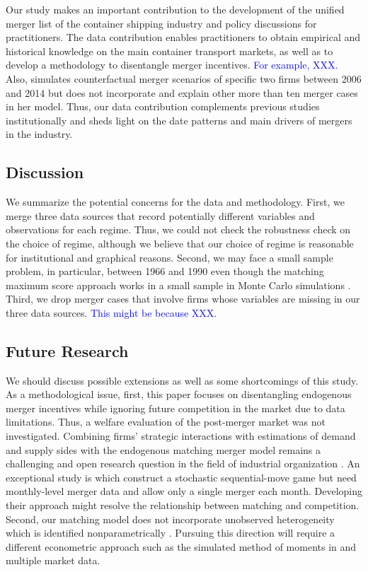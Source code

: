 \documentclass[10pt]{article}
\begin{document}
Our study makes an important contribution to the development of the unified merger list of the container shipping industry and policy discussions for practitioners. 
The data contribution enables practitioners to obtain empirical and historical knowledge on the main container transport markets, as well as to develop a methodology to disentangle merger incentives.
\textcolor{blue}{For example, XXX.} Also, \cite{jeon2022learning} simulates counterfactual merger scenarios of specific two firms between 2006 and 2014 but does not incorporate and explain other more than ten merger cases in her model.
Thus, our data contribution complements previous studies institutionally and sheds light on the date patterns and main drivers of mergers in the industry.


\subsection{Discussion}
We summarize the potential concerns for the data and methodology. 
First, we merge three data sources that record potentially different variables and observations for each regime. 
Thus, we could not check the robustness check on the choice of regime, although we believe that our choice of regime is reasonable for institutional and graphical reasons.
Second, we may face a small sample problem, in particular, between 1966 and 1990 even though the matching maximum score approach works in a small sample in Monte Carlo simulations \citep{akkus2015ms,otani2021matching_cost}.
Third, we drop merger cases that involve firms whose variables are missing in our three data sources. 
\textcolor{blue}{This might be because XXX.}


\subsection{Future Research}

We should discuss possible extensions as well as some shortcomings of this study. 
As a methodological issue, first, this paper focuses on disentangling endogenous merger incentives while ignoring future competition in the market due to data limitations. 
Thus, a welfare evaluation of the post-merger market was not investigated.
Combining firms' strategic interactions with estimations of demand and supply sides with the endogenous matching merger model remains a challenging and open research question in the field of industrial organization \citep{agarwal2021market}. 
An exceptional study is \cite{igami2019mergers} which construct a stochastic sequential-move game but need monthly-level merger data and allow only a single merger each month. 
Developing their approach might resolve the relationship between matching and competition.
Second, our matching model does not incorporate unobserved heterogeneity which is identified nonparametrically \citep{fox2018jpe}.
Pursuing this direction will require a different econometric approach such as the simulated method of moments in \cite{fox2018jpe} and multiple market data. 
\end{document}
